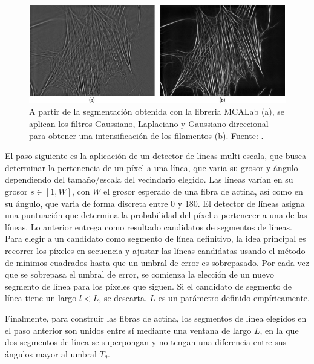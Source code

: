 \begin{figure}[t]
    \centering
    \includegraphics[scale=2]{imagenes/Aliosha2016-GaussLaplFilters.jpg}
    \caption[Aplicaci\'on de filtros posterior a la segmentaci\'on.]{A partir de la segmentaci\'on obtenida con la libreria MCALab (a), se aplican los filtros Gaussiano, Laplaciano y Gaussiano direccional para obtener una intensificaci\'on de los filamentos (b). Fuente: \citet{alioscha2016robust}.}
    \label{fig:AlioshaRobust}
\end{figure}

El paso siguiente es la aplicaci\'on de un detector de l\'ineas multi-escala, que busca determinar la pertenencia de un p\'ixel a una l\'inea, que varia su grosor y \'angulo dependiendo del tama\~no/escala del vecindario elegido. Las l\'ineas var\'ian en su grosor $s \in [1,W]$, con $W$ el grosor esperado de una fibra de actina, as\'i como en su \'angulo, que varia de forma discreta entre 0 y 180\textdegree. El detector de l\'ineas asigna una puntuaci\'on que determina la probabilidad del p\'ixel a pertenecer a una de las l\'ineas. Lo anterior entrega como resultado candidatos de segmentos de l\'ineas. Para elegir a un candidato como segmento de l\'inea definitivo, la idea principal es recorrer los p\'ixeles en secuencia y ajustar las l\'ineas candidatas usando el m\'etodo de m\'inimos cuadrados hasta que un umbral de error es sobrepasado. Por cada vez que se sobrepasa el umbral de error, se comienza la elecci\'on de un nuevo segmento de l\'inea para los p\'ixeles que siguen. Si el candidato de segmento de l\'inea tiene un largo $l < L$, se descarta. $L$ es un par\'ametro definido emp\'iricamente.

Finalmente, para construir las fibras de actina, los segmentos de l\'inea elegidos en el paso anterior son unidos entre s\'i mediante una ventana de largo $L$, en la que dos segmentos de l\'inea se superpongan y no tengan una diferencia entre sus \'angulos mayor al umbral $T_{\theta}$. 

